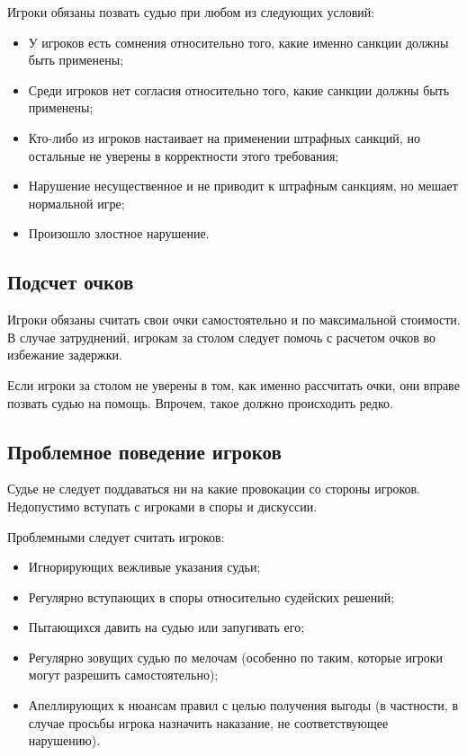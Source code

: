 Игроки обязаны позвать судью при любом из следующих условий:
\begin{itemize}
	\item У игроков есть сомнения относительно того, какие именно санкции должны быть применены;
	\item Среди игроков нет согласия относительно того, какие санкции должны быть применены;
	\item Кто-либо из игроков настаивает на применении штрафных санкций, но остальные не уверены в корректности этого требования;
	\item Нарушение несущественное и не приводит к штрафным санкциям, но мешает нормальной игре;
	\item Произошло злостное нарушение.
\end{itemize}

\subsection{Подсчет очков}

Игроки обязаны считать свои очки самостоятельно и по максимальной стоимости. В случае затруднений, игрокам за столом следует помочь с расчетом очков во избежание задержки.

Если игроки за столом не уверены в том, как именно рассчитать очки, они вправе позвать судью на помощь. Впрочем, такое должно происходить редко.

\subsection{Проблемное поведение игроков}

Судье не следует поддаваться ни на какие провокации со стороны игроков. Недопустимо вступать с игроками в споры и дискуссии. 

Проблемными следует считать игроков:
\begin{itemize}
	\item Игнорирующих вежливые указания судьи;
	\item Регулярно вступающих в споры относительно судейских решений;
	\item Пытающихся давить на судью или запугивать его;
	\item Регулярно зовущих судью по мелочам (особенно по таким, которые игроки могут разрешить самостоятельно);
	\item Апеллирующих к нюансам правил с целью получения выгоды (в частности, в случае просьбы игрока назначить наказание, не соответствующее нарушению).
\end{itemize}


